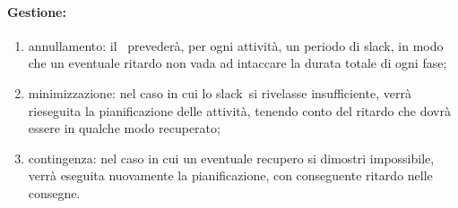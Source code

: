 \documentclass[../PianoProgetto.tex]{subfiles}
\begin{document}
	\paragraph*{Gestione:}
	\begin{enumerate}
		\item annullamento: il \responsabilediprogetto\ prevederà, per ogni attività, un periodo di slack\g, in modo che un eventuale ritardo non vada ad intaccare la durata totale di ogni fase\g ;
		\item minimizzazione: nel caso in cui lo slack\g\ si rivelasse insufficiente, verrà rieseguita la pianificazione delle attività, tenendo conto del ritardo che dovrà essere in qualche modo recuperato;
		\item contingenza: nel caso in cui un eventuale recupero si dimostri impossibile, verrà eseguita nuovamente la pianificazione, con conseguente ritardo nelle consegne.
	\end{enumerate}	
	
	
\end{document}
